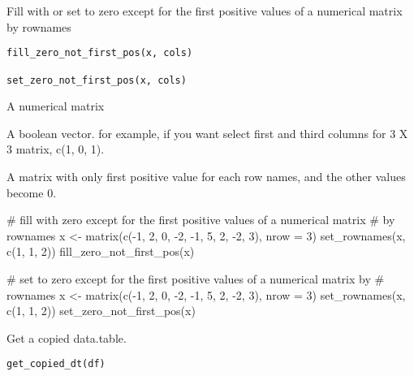 \documentclass[letterpaper]{book}
\begin{document}
%
\begin{Description}
Fill with or set to zero except for the first positive values of a numerical
matrix by rownames
\end{Description}
%
\begin{Usage}
\begin{verbatim}
fill_zero_not_first_pos(x, cols)

set_zero_not_first_pos(x, cols)
\end{verbatim}
\end{Usage}
%
\begin{Arguments}
\begin{ldescription}
\item[\code{x}] A numerical matrix

\item[\code{cols}] A boolean vector. for example, if you want select first and third
columns for 3 X 3 matrix, c(1, 0, 1).
\end{ldescription}
\end{Arguments}
%
\begin{Value}
A matrix with only first positive value for each row names, and the
other values become 0.
\end{Value}
%
\begin{Examples}
\begin{ExampleCode}
# fill with zero except for the first positive values of a numerical matrix
# by rownames
x <- matrix(c(-1, 2, 0, -2, -1, 5, 2, -2, 3), nrow = 3)
set_rownames(x, c(1, 1, 2))
fill_zero_not_first_pos(x)

# set to zero except for the first positive values of a numerical matrix by
# rownames
x <- matrix(c(-1, 2, 0, -2, -1, 5, 2, -2, 3), nrow = 3)
set_rownames(x, c(1, 1, 2))
set_zero_not_first_pos(x)

\end{ExampleCode}
\end{Examples}
%
\begin{Description}
Get a copied data.table.
\end{Description}
%
\begin{Usage}
\begin{verbatim}
get_copied_dt(df)
\end{verbatim}
\end{Usage}
\end{document}
